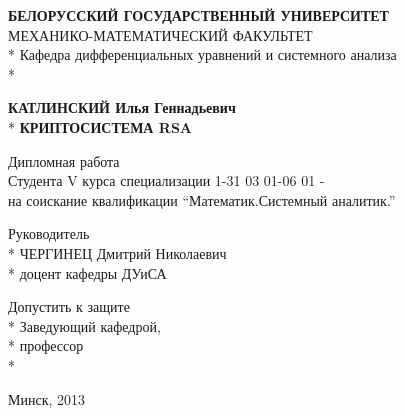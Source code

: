 \begin{titlepage}
	\newpage

	\begin{center}

		\textbf{БЕЛОРУССКИЙ ГОСУДАРСТВЕННЫЙ УНИВЕРСИТЕТ} \\
		\vspace{0.5cm}		
		МЕХАНИКО-МАТЕМАТИЧЕСКИЙ ФАКУЛЬТЕТ \\*
		Кафедра дифференциальных уравнений и системного анализа \\*

	\end{center}

	\vspace{5em}

	\begin{center}
		\textbf{КАТЛИНСКИЙ Илья Геннадьевич} \\*
		\vspace{0.5cm}
		\textbf{КРИПТОСИСТЕМА RSA}
	\end{center}

	\vspace{2.5em}
	 
	\begin{center}
		Дипломная работа \\ Студента V курса специализации 1-31 03 01-06 01 - \\
		на соискание квалификации “Математик.Системный аналитик.”
	\end{center}

	\vspace{6em}
	 
	\begin{flushright}
		Руководитель \\*	
		ЧЕРГИНЕЦ Дмитрий Николаевич \\*
		доцент кафедры ДУиСА		
	\end{flushright}

	\begin{flushleft}
		Допустить к защите \\*
		Заведующий кафедрой, \\*
		профессор \\*		
	\end{flushleft}
	 
	\vspace{\fill}

	\begin{center}
		Минск, 2013
	\end{center}

\end{titlepage}